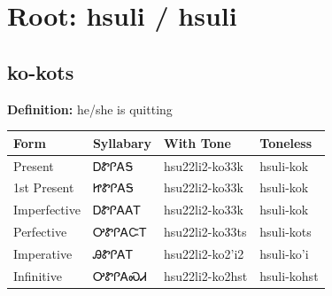 \documentclass{article}%
\begin{document}
%
\normalsize%
\section*{Root: hsuli / hsuli}%
\subsection*{ko-kots}%
\textbf{Definition: }%
he/she is quitting%
\\[0.5em]%
\begin{tabular}{|l|l|l|l|}%
\hline%
\textbf{Form}&\textbf{Syllabary}&\textbf{With Tone}&\textbf{Toneless}\\%
\hline%
Present&ᎠᏑᎵᎪᎦ&hsu22li2{-}ko33k&hsuli{-}kok\\%
1st Present&ᏥᏑᎵᎪᎦ&hsu22li2{-}ko33k&hsuli{-}kok\\%
Imperfective&ᎠᏑᎵᎪᎪᎢ&hsu22li2{-}ko33k&hsuli{-}kok\\%
Perfective&ᎤᏑᎵᎪᏨᎢ&hsu22li2{-}ko33ts&hsuli{-}kots\\%
Imperative&ᎯᏑᎵᎪᎢ&hsu22li2{-}ko2'i2&hsuli{-}ko'i\\%
Infinitive&ᎤᏑᎵᎪᏍᏗ&hsu22li2{-}ko2hst&hsuli{-}kohst\\%
\hline%
\end{tabular}%
\\[1em]%
\end{document}
